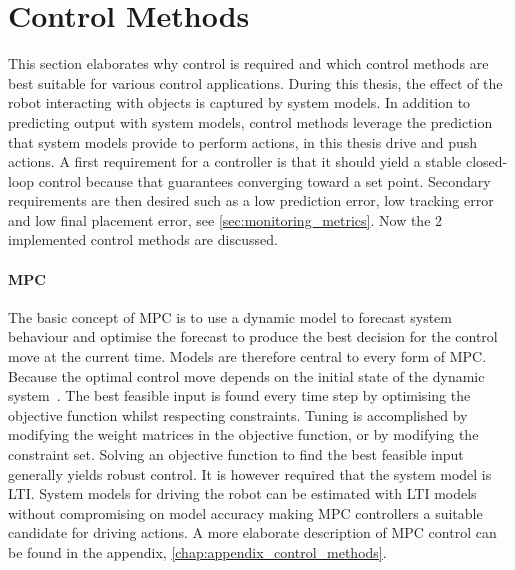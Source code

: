 \section{Control Methods}%
\label{sec:control_methods}
This section elaborates why control is required and which control methods are best suitable for various control applications. During this thesis, the effect of the robot interacting with objects is captured by system models. In addition to predicting output with system models, control methods leverage the prediction that system models provide to perform actions, in this thesis drive and push actions. A first requirement for a controller is that it should yield a stable closed-loop control because that guarantees converging toward a set point. Secondary requirements are then desired such as a low prediction error, low tracking error and low final placement error, see \cref{sec:monitoring_metrics}. Now the 2 implemented control methods are discussed.\bs

\paragraph{\acl{MPC}}
The basic concept of \ac{MPC} is to use a dynamic model to forecast system behaviour and optimise the forecast to produce the best decision for the control move at the current time. Models are therefore central to every form of \ac{MPC}. Because the optimal control move depends on the initial state of the dynamic system~\cite{rawlings_model_2020}. The best feasible input is found every time step by optimising the objective function whilst respecting constraints. Tuning is accomplished by modifying the weight matrices in the objective function, or by modifying the constraint set. Solving an objective function to find the best feasible input generally yields robust control. It is however required that the system model is \ac{LTI}. System models for driving the robot can be estimated with \ac{LTI} models without compromising on model accuracy making \ac{MPC} controllers a suitable candidate for driving actions. A more elaborate description of \ac{MPC} control can be found in the appendix, \cref{chap:appendix_control_methods}.

